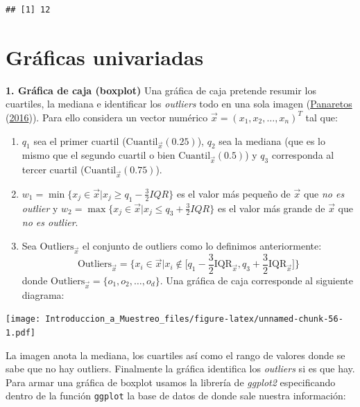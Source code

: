 \documentclass[
]{book}
\providecommand{\tightlist}{%
  \setlength{\itemsep}{0pt}\setlength{\parskip}{0pt}}
\begin{document}
\begin{verbatim}
## [1] 12
\end{verbatim}

\hypertarget{gruxe1ficas-univariadas}{%
\section{Gráficas univariadas}\label{gruxe1ficas-univariadas}}

\textbf{1. Gráfica de caja (boxplot)}
Una gráfica de caja pretende resumir los cuartiles, la mediana e identificar los \emph{outliers} todo en una sola imagen (\protect\hyperlink{ref-panaretos2016statistics}{Panaretos} (\protect\hyperlink{ref-panaretos2016statistics}{2016})). Para ello considera un vector numérico \(\vec{x} = (x_1, x_2, \dots, x_n)^T\) tal que:

\begin{enumerate}
\def\labelenumi{\arabic{enumi}.}
\tightlist
\item
  \(q_1\) sea el primer cuartil (\(\textrm{Cuantil}_{\vec{x}}(0.25)\)), \(q_2\) sea la mediana (que es lo mismo que el segundo cuartil o bien \(\textrm{Cuantil}_{\vec{x}}(0.5)\)) y \(q_3\) corresponda al tercer cuartil (\(\textrm{Cuantil}_{\vec{x}}(0.75)\)).
\item
  \(w_1 = \min \{x_j \in \vec{x} | x_j \geq q_1 - \frac{3}{2} IQR \}\) es el valor más pequeño de \(\vec{x}\) que \emph{no es outlier} y \(w_2 = \max \{x_j \in \vec{x} | x_j \leq q_3 + \frac{3}{2} IQR \}\) es el valor más grande de \(\vec{x}\) que \emph{no es outlier}.
\item
  Sea \(\textrm{Outliers}_{\vec{x}}\) el conjunto de outliers como lo definimos anteriormente:
  \[
  \textrm{Outliers}_{\vec{x}} = \Big\{ x_i \in \vec{x} \big| x_i \not\in \big[ q_1 - \frac{3}{2} \text{IQR}_{\vec{x}}, q_3 + \frac{3}{2} \text{IQR}_{\vec{x}}\big] \Big\}
  \]
  donde \(\textrm{Outliers}_{\vec{x}} = \{ o_1, o_2, \dots, o_d \}\). Una gráfica de caja corresponde al siguiente diagrama:
\end{enumerate}

\texttt{[image: Introduccion\_a\_Muestreo\_files/figure-latex/unnamed-chunk-56-1.pdf]}

La imagen anota la mediana, los cuartiles así como el rango de valores donde se sabe que no hay outliers. Finalmente la gráfica identifica los \emph{outliers} si es que hay. Para armar una gráfica de boxplot usamos la librería de \emph{ggplot2} especificando dentro de la función \texttt{ggplot} la base de datos de donde sale nuestra información:
\end{document}
